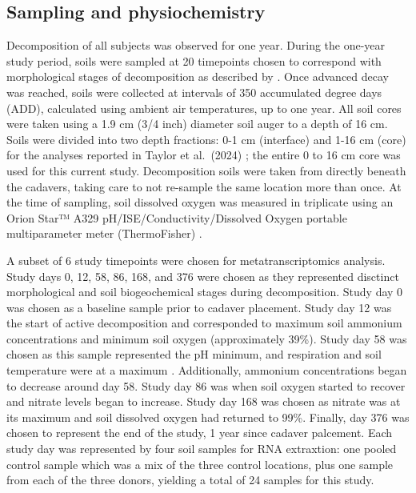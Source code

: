 \documentclass[
  sn-nature,
  lineno, referee]{sn-jnl}
\begin{document}
\subsection{Sampling and
physiochemistry}\label{sampling-and-physiochemistry}

Decomposition of all subjects was observed for one year. During the
one-year study period, soils were sampled at 20 timepoints chosen to
correspond with morphological stages of decomposition as described by
\citep{payne_summer_1965}. Once advanced decay was reached, soils were
collected at intervals of 350 accumulated degree days (ADD), calculated
using ambient air temperatures, up to one year. All soil cores were
taken using a 1.9 cm (3/4 inch) diameter soil auger to a depth of 16 cm.
Soils were divided into two depth fractions: 0-1 cm (interface) and 1-16
cm (core) for the analyses reported in Taylor et al.~(2024)
\citep{taylor_transient_2024}; the entire 0 to 16 cm core was used for
this current study. Decomposition soils were taken from directly beneath
the cadavers, taking care to not re-sample the same location more than
once. At the time of sampling, soil dissolved oxygen was measured in
triplicate using an Orion Star™ A329 pH/ISE/Conductivity/Dissolved
Oxygen portable multiparameter meter (ThermoFisher)
\citep{taylor_transient_2024}.

A subset of 6 study timepoints were chosen for metatranscriptomics
analysis. Study days 0, 12, 58, 86, 168, and 376 were chosen as they
represented disctinct morphological and soil biogeochemical stages
during decomposition. Study day 0 was chosen as a baseline sample prior
to cadaver placement. Study day 12 was the start of active decomposition
and corresponded to maximum soil ammonium concentrations and minimum
soil oxygen (approximately 39\%). Study day 58 was chosen as this sample
represented the pH minimum, and respiration and soil temperature were at
a maximum \citep{taylor_transient_2024}. Additionally, ammonium
concentrations began to decrease around day 58. Study day 86 was when
soil oxygen started to recover and nitrate levels began to increase.
Study day 168 was chosen as nitrate was at its maximum and soil
dissolved oxygen had returned to 99\%. Finally, day 376 was chosen to
represent the end of the study, 1 year since cadaver palcement. Each
study day was represented by four soil samples for RNA extraxtion: one
pooled control sample which was a mix of the three control locations,
plus one sample from each of the three donors, yielding a total of 24
samples for this study.
\end{document}

